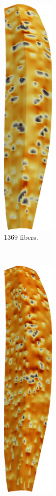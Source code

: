 \begin{figure}
  \centering%
  \begin{subfigure}[t]{0.19\textwidth}%
    \centering%
    \includegraphics[height=12cm]{images/results/application/emg37.png}%
    \caption{$1369$ fibers.}%
    \label{fig:emg37}%
  \end{subfigure} \,
  \begin{subfigure}[t]{0.19\textwidth}%
    \centering%
    \includegraphics[height=12cm]{images/results/application/emg67.png}%

\end{subfigure}
\end{figure}
